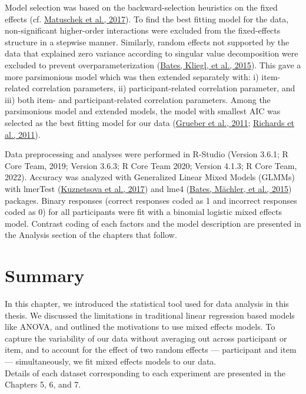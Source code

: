 \documentclass[a4paper, nobind]{templates/ociamthesis}
\begin{document}
Model selection was based on the backward-selection heuristics on the fixed effects (cf. \protect\hyperlink{ref-Matuschek2017}{Matuschek et al., 2017}).
To find the best fitting model for the data,
non-significant higher-order interactions were excluded from the fixed-effects structure in a stepwise manner.
Similarly, random effects not supported by the data that explained zero variance according to singular value decomposition were excluded to prevent overparameterization (\protect\hyperlink{ref-Bates2015a}{Bates, Kliegl, et al., 2015}).
This gave a more parsimonious model which was then extended separately with: i) item-related correlation parameters, ii) participant-related correlation parameter, and iii) both item- and participant-related correlation parameters.
Among the parsimonious model and extended models,
the model with smallest AIC was selected as the best fitting model for our data (\protect\hyperlink{ref-Grueber2011}{Grueber et al., 2011}; \protect\hyperlink{ref-Richards2011}{Richards et al., 2011}).

Data preprocessing and analyses were performed in R-Studio (Version 3.6.1; R Core Team, 2019; Version 3.6.3; R Core Team 2020; Version 4.1.3; R Core Team, 2022).
Accuracy was analyzed with Generalized Linear Mixed Models (GLMMs) with lmerTest (\protect\hyperlink{ref-Kuznetsova2017}{Kuznetsova et al., 2017}) and lme4 (\protect\hyperlink{ref-Bates2015}{Bates, Mächler, et al., 2015}) packages.
Binary responses (correct responses coded as 1 and incorrect responses coded as 0) for all participants were fit with a binomial logistic mixed effects model.
Contrast coding of each factors and the model description are presented in the Analysis section of the chapters that follow.

\hypertarget{summary-1}{%
\section{Summary}\label{summary-1}}

In this chapter, we introduced the statistical tool used for data analysis in this thesis.
We discussed the limitations in traditional linear regression based models like ANOVA,
and outlined the motivations to use mixed effects models.
To capture the variability of our data without averaging out across participant or item,
and to account for the effect of two random effects --- participant and item --- simultaneously,
we fit mixed effects models to our data.\\
Details of each dataset corresponding to each experiment are presented in the Chapters 5, 6, and 7.
\end{document}
